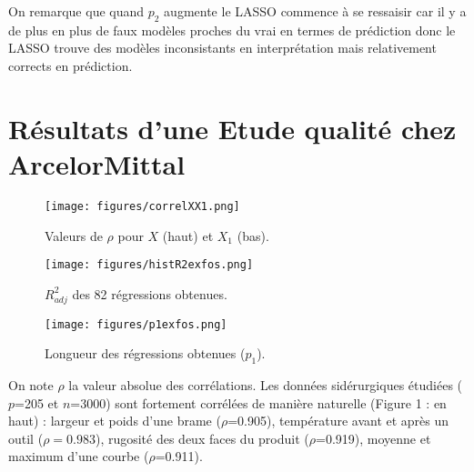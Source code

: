\documentclass[12pt]{article}
\begin{document}
On remarque que quand $p_2$ augmente le LASSO commence à se ressaisir car il y a de plus en plus de faux modèles proches du vrai en termes de prédiction donc le LASSO trouve des modèles inconsistants en interprétation mais relativement corrects en prédiction. %
\section{Résultats d'une Etude qualité chez ArcelorMittal}\label{secresrel}
\begin{figure}[h!]
	\begin{minipage}[l]{.30\linewidth}
			\texttt{[image: figures/correlXX1.png]} 
			\caption{Valeurs de $\rho$ pour $X$ (haut) et $X_1$ (bas).}
	\end{minipage} \hfill
	\begin{minipage}[c]{.30\linewidth}
			\texttt{[image: figures/histR2exfos.png]} 
			\caption{$R^2_{adj}$ des 82 régressions obtenues.}
	\end{minipage} \hfill
   \begin{minipage}[r]{.30\linewidth}
			\texttt{[image: figures/p1exfos.png]} 
			\caption{Longueur des régressions obtenues ($p_1$).}
   \end{minipage}
\end{figure}   	
On note $\rho$ la valeur absolue des corrélations. Les données sidérurgiques étudiées ($p$=205 et $n$=3000) sont fortement corrélées de manière naturelle (Figure 1 : en haut) : largeur et poids d'une brame ($\rho$=0.905), température avant et après un outil ($\rho=0.983$), rugosité des deux faces du produit ($\rho$=0.919), moyenne et maximum d'une courbe ($\rho$=0.911).
%
\end{document}
